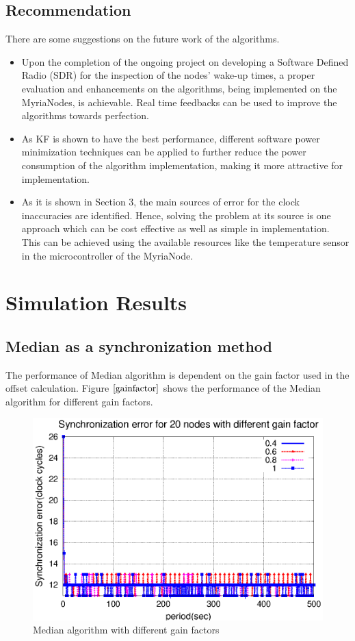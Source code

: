 \documentclass[a4paper,10pt]{report}
\begin{document}
\section{\textbf{Recommendation}}
There are some suggestions on the future work of the algorithms.
\begin{itemize}
 \item
Upon the completion of the ongoing project on developing a Software Defined Radio (SDR) for the inspection of the nodes' wake-up times,
a proper evaluation and enhancements on the algorithms, being implemented on the MyriaNodes, is achievable. Real time feedbacks
can be used to improve the algorithms towards perfection.
\item
As KF is shown to have the best performance, different software power minimization techniques can be applied to further reduce the
power consumption of the algorithm implementation, making it more attractive for implementation. \item As it is shown in Section 3, the main sources of error for the clock inaccuracies are identified. Hence, solving the problem at its source is one approach which can be cost
effective as well as simple in implementation. This can be achieved using the available resources like the temperature sensor in the
microcontroller of the MyriaNode.
\end{itemize}
\appendix
\chapter{Simulation Results}
\section{\textbf{Median as a synchronization method}}
The performance of Median algorithm is dependent on the gain factor used in the offset calculation. Figure $\ref{gainfactor}$ shows the performance of the Median algorithm for different gain factors.
\begin{figure}[!h]
\centering
\includegraphics[width= 0.7 \textwidth]{gainfactor}
\caption{Median algorithm with different gain factors} \label{gainfactor}
\end{figure}
\end{document}
